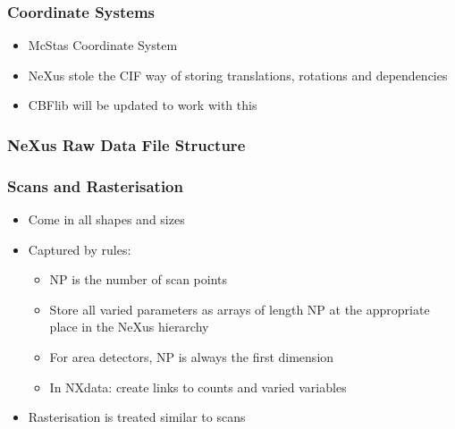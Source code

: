 \documentclass{beamer}
\begin{document}
\begin{frame} \frametitle{Coordinate Systems}
\begin{itemize}
\item McStas Coordinate System
\item NeXus stole the CIF way of storing translations, rotations and dependencies
\item CBFlib will be updated to work with this
\end{itemize}
\end{frame}



\begin{frame} \frametitle{NeXus Raw Data File Structure}
\begin{figure}[!ht]
\end{figure}
\end{frame}

\begin{frame}
\frametitle{Scans and Rasterisation}
\begin{itemize}
\item Come in all shapes and sizes
\item Captured by rules:
\begin{itemize}
\item NP is the number of scan points
\item Store all varied parameters as arrays of length NP at the 
  appropriate place in the NeXus hierarchy
\item For area detectors, NP is always the first dimension
\item In NXdata: create links to counts and varied variables
\end{itemize}
\item Rasterisation is treated similar to scans
\end{itemize}
\end{frame}
\end{document}
